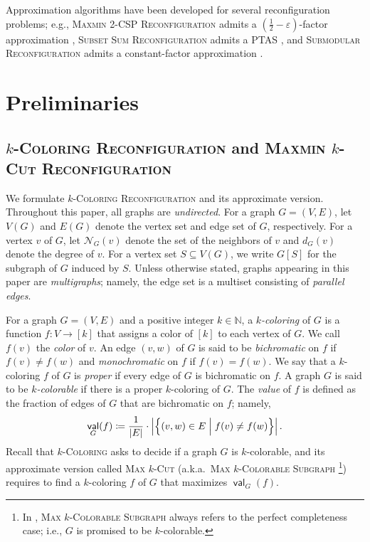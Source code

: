 \documentclass[11pt,fleqn]{article}
\renewcommand{\epsilon}{\varepsilon}
\newcommand{\prb}[1]{\textsc{#1}\xspace}
\newcommand{\defeq}{\coloneq}
\DeclareMathOperator{\val}{\mathsf{val}}
\newcommand{\nei}{\calN}
\newcommand{\f}{f}
\newcommand{\kColReconf}{\prb{$k$-Coloring Reconfiguration}}
\newcommand{\MMkCutReconf}{\prb{Maxmin $k$-Cut Reconfiguration}}
\newcommand{\calN}{\mathcal{N}}
\newcommand{\bbN}{\mathbb{N}}
\theoremstyle{definition}
\numberwithin{equation}{section}
\begin{document}
Approximation algorithms have been developed for several reconfiguration problems; e.g.,
\prb{Maxmin 2-CSP Reconfiguration} admits
    a $\left(\frac{1}{2} - \epsilon\right)$-factor approximation \cite{karthik2023inapproximability},
\prb{Subset Sum Reconfiguration} admits
    a PTAS \cite{ito2014approximability}, and
\prb{Submodular Reconfiguration} admits
    a constant-factor approximation \cite{ohsaka2022reconfiguration}.
 \section{Preliminaries}
\label{sec:pre}


\subsection{\kColReconf and \MMkCutReconf}
We formulate \kColReconf and its approximate version.
Throughout this paper, all graphs are \emph{undirected}.
For a graph $G=(V,E)$,
let $V(G)$ and $E(G)$ denote the vertex set and edge set of $G$, respectively.
For a vertex $v$ of $G$,
let $\nei_G(v)$ denote the set of the neighbors of $v$ and
$d_G(v)$ denote the degree of $v$.
For a vertex set $S \subseteq V(G)$, we write $G[S]$ for the subgraph of $G$ induced by $S$.
Unless otherwise stated, graphs appearing in this paper are \emph{multigraphs}; namely, 
the edge set is a multiset consisting of \emph{parallel edges}.


For a graph $G=(V,E)$ and a positive integer $k \in \bbN$,
a \emph{$k$-coloring} of $G$ is a function $\f \colon V \to [k]$
that assigns a color of $[k]$ to each vertex of $G$.
We call $\f(v)$ the \emph{color} of $v$.
An edge $(v,w)$ of $G$ is said to be
\emph{bichromatic} on $\f$ if $\f(v) \neq \f(w)$ and
\emph{monochromatic} on $\f$ if $\f(v) = \f(w)$.
We say that a $k$-coloring $\f$ of $G$ is \emph{proper}
if every edge of $G$ is bichromatic on $f$.
A graph $G$ is said to be \emph{$k$-colorable} if there is a proper $k$-coloring of $G$.
The \emph{value} of $\f$
is defined as the fraction of edges of $G$ that are bichromatic on $\f$; namely,
\begin{align}
    \val_G(\f) \defeq \frac{1}{|E|} \cdot \left|\Bigl\{
        (v,w) \in E \Bigm| \f(v) \neq \f(w)
    \Bigr\}\right|.
\end{align}
Recall that
\prb{$k$-Coloring} asks to decide if a graph $G$ is $k$-colorable, and
its approximate version called \prb{Max $k$-Cut}
(a.k.a.~\prb{Max $k$-Colorable Subgraph} \cite{papadimitriou1991optimization,guruswami2013improved}\footnote{
In \cite{guruswami2013improved},
\prb{Max $k$-Colorable Subgraph} always refers to the perfect completeness case;
i.e., $G$ is promised to be $k$-colorable.
})
requires to find a $k$-coloring $\f$ of $G$ that maximizes $\val_G(\f)$.
\end{document}
